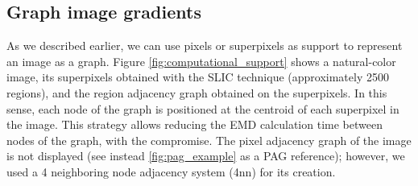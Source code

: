 %    
%	   

\subsection{Graph image gradients}

As we described earlier, we can use pixels or superpixels as support to represent an image as a graph. Figure \ref{fig:computational_support} shows a natural-color image, its superpixels obtained with the SLIC technique (approximately 2500 regions), and the region adjacency graph obtained on the superpixels. In this sense, each node of the graph is positioned at the centroid of each superpixel in the image. This strategy allows reducing the EMD calculation time between nodes of the graph, with the compromise. The pixel adjacency graph of the image is not displayed (see instead \ref{fig:pag_example} as a PAG reference); however, we used a 4 neighboring node adjacency system (4nn) for its creation.

